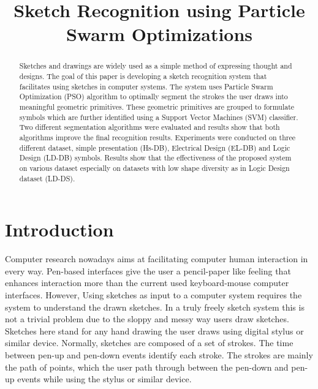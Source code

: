 \documentclass{article}
\title{Sketch Recognition using Particle Swarm Optimizations}
\begin{document}
\maketitle
\begin{abstract}
Sketches and drawings are widely used as a simple method of expressing thought and designs. The goal of this paper is developing a sketch recognition system that facilitates using sketches in computer systems. The system uses Particle Swarm Optimization (PSO) algorithm to optimally segment the strokes the user draws into meaningful geometric primitives.  These geometric primitives are grouped to formulate symbols which are further identified using a Support Vector Machines (SVM) classifier. Two different segmentation algorithms were evaluated and results show that both algorithms improve the final recognition results. Experiments were conducted on three different dataset, simple presentation (Hs-DB), Electrical Design (EL-DB) and Logic Design (LD-DB) symbols. Results show that the effectiveness of the proposed system on various dataset especially on datasets with low shape diversity as in Logic Design dataset (LD-DS).  %
\end{abstract}

\section{Introduction}

Computer research nowadays aims at facilitating computer human interaction in every way. Pen-based interfaces give the user a pencil-paper like feeling that enhances interaction more than the current used keyboard-mouse computer interfaces. However, Using sketches as input to a computer system requires the system to understand the drawn sketches. In a truly freely sketch system this is not a trivial problem due to the sloppy and messy way users draw sketches. Sketches here stand for any hand drawing the user draws using digital stylus or similar device. Normally, sketches are composed of a set of strokes. The time between pen-up and pen-down events identify each stroke. The strokes are mainly the path of points, which the user path through between the pen-down and pen-up events while using the stylus or similar device. 
\end{document}
